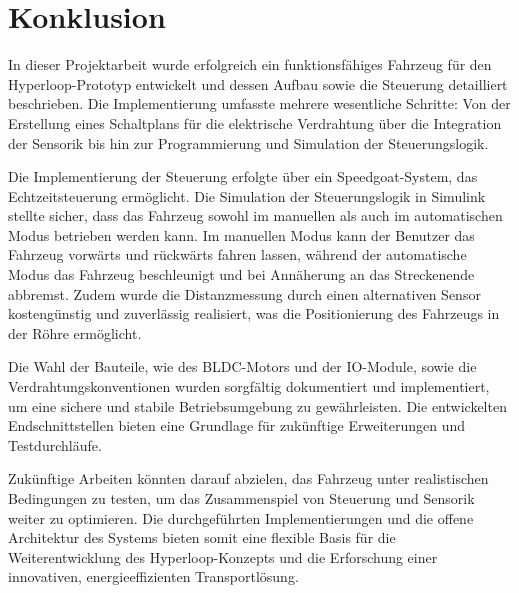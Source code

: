 \chapter{Konklusion}


In dieser Projektarbeit wurde erfolgreich ein funktionsfähiges Fahrzeug für den Hyperloop-Prototyp entwickelt und dessen Aufbau sowie die Steuerung detailliert beschrieben. Die Implementierung umfasste mehrere wesentliche Schritte: Von der Erstellung eines Schaltplans für die elektrische Verdrahtung über die Integration der Sensorik bis hin zur Programmierung und Simulation der Steuerungslogik.

Die Implementierung der Steuerung erfolgte über ein Speedgoat-System, das Echtzeitsteuerung ermöglicht. Die Simulation der Steuerungslogik in Simulink stellte sicher, dass das Fahrzeug sowohl im manuellen als auch im automatischen Modus betrieben werden kann. Im manuellen Modus kann der Benutzer das Fahrzeug vorwärts und rückwärts fahren lassen, während der automatische Modus das Fahrzeug beschleunigt und bei Annäherung an das Streckenende abbremst. Zudem wurde die Distanzmessung durch einen alternativen Sensor kostengünstig und zuverlässig realisiert, was die Positionierung des Fahrzeugs in der Röhre ermöglicht.

Die Wahl der Bauteile, wie des BLDC-Motors und der IO-Module, sowie die Verdrahtungskonventionen wurden sorgfältig dokumentiert und implementiert, um eine sichere und stabile Betriebsumgebung zu gewährleisten. Die entwickelten Endschnittstellen bieten eine Grundlage für zukünftige Erweiterungen und Testdurchläufe.

Zukünftige Arbeiten könnten darauf abzielen, das Fahrzeug unter realistischen Bedingungen zu testen, um das Zusammenspiel von Steuerung und Sensorik weiter zu optimieren. Die durchgeführten Implementierungen und die offene Architektur des Systems bieten somit eine flexible Basis für die Weiterentwicklung des Hyperloop-Konzepts und die Erforschung einer innovativen, energieeffizienten Transportlösung.